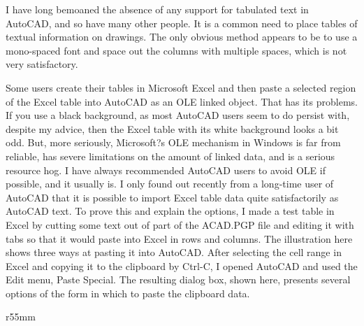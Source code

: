 \documentclass[a4paper]{article}
\begin{document}
\doublespacing
{}
\fontsize{6}{7}
\selectfont

I have long bemoaned the absence of any support for tabulated text in AutoCAD, and so have many other people. It is a common need to place tables of textual information on drawings. The only obvious method appears to be to use a mono-spaced font and space out the columns with multiple spaces, which is not very satisfactory.

Some users create their tables in Microsoft Excel and then paste a selected region of the Excel table into AutoCAD as an OLE linked object. That has its problems. If you use a black background, as most AutoCAD users seem to do persist with, despite my advice, then the Excel table with its white background looks a bit odd. But, more seriously, Microsoft?s OLE mechanism in Windows is far from reliable, has severe limitations on the amount of linked data, and is a serious resource hog. I have always recommended AutoCAD users to avoid OLE if possible, and it usually is.
I only found out recently from a long-time user of AutoCAD that it is possible to import Excel table data quite satisfactorily as AutoCAD text. To prove this and explain the options, I made a test table in Excel by cutting some text out of part of the ACAD.PGP file and editing it with tabs so that it would paste into Excel in rows and columns. The illustration here shows three ways at pasting it into AutoCAD. After selecting the cell range in Excel and copying it to the clipboard by Ctrl-C, I opened AutoCAD and used the Edit menu, Paste Special. The resulting dialog box, shown here, presents several options of the form in which to paste the clipboard data.

\begin{wrapfigure}{r}{55mm}
\end{wrapfigure}
\end{document}
